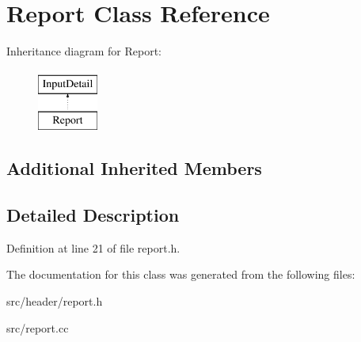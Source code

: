 \hypertarget{classReport}{\section{Report Class Reference}
\label{classReport}
}
Inheritance diagram for Report\-:\begin{figure}[H]
\begin{center}
\leavevmode
\includegraphics[height=2.000000cm]{classReport}
\end{center}
\end{figure}
\subsection*{Additional Inherited Members}


\subsection{Detailed Description}


Definition at line 21 of file report.\-h.



The documentation for this class was generated from the following files\-:\begin{DoxyCompactItemize}
\item 
src/header/report.\-h\item 
src/report.\-cc\end{DoxyCompactItemize}
